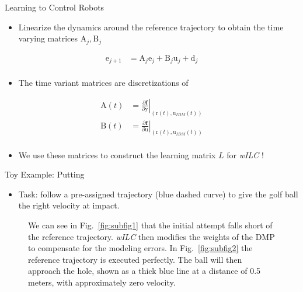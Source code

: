 \documentclass[handout]{beamer}
\newcommand{\boldvec}[1]{\boldsymbol{\mathrm{#1}}}
\let\vec\boldvec
\newcommand\at[2]{\left.#1\right|_{#2}} %
\newcommand{\state}{\vec{y}} %
\newcommand{\error}{\vec{e}} %
\newcommand{\traj}{\vec{r}} %
\newcommand{\linDist}{\vec{d}} %
\newcommand{\sysInput}{\vec{u}} %
\newcommand{\alg}{\emph{wILC }}
\begin{document}
\begin{frame}{Learning to Control Robots}
\begin{itemize}
\item Linearize the dynamics around the reference trajectory to obtain the time varying matrices $\vec{A}_j, \vec{B}_j$
\end{itemize}
\begin{equation*}
\begin{aligned}
\error_{j+1} &= \vec{A}_j\error_j + \vec{B}_j\sysInput_j + \linDist_j\\
\end{aligned}
\end{equation*} 
\begin{itemize}
\item The time variant matrices are discretizations of 
\end{itemize}
\begin{equation*}
\begin{aligned}
\vec{A}(t) & = \at{\frac{\partial{\mathbf{f}}}{\partial{\state}}}{(\traj(t),\sysInput_{IDM}(t))} \\
\vec{B}(t) & = \at{\frac{\partial{\mathbf{f}}}{\partial{\sysInput}}}{(\traj(t),\sysInput_{IDM}(t))} \\
\end{aligned}
\end{equation*}
\begin{itemize}
\item We use these matrices to construct the learning matrix $L$ for \alg! 
\end{itemize}
\end{frame}
%
\begin{frame}{Toy Example: Putting}
\begin{itemize}
\item Task: follow a pre-assigned trajectory (blue dashed curve) to give the golf ball the right velocity at impact.
\end{itemize}
\begin{figure}[ht]
\centering
{}
\caption{We can see in Fig.~\ref{fig:subfig1} that the initial attempt falls short of the reference trajectory. \alg then modifies the weights of the DMP to compensate for the modeling errors. In Fig.~\ref{fig:subfig2} the reference trajectory is executed perfectly. The ball will then approach the hole, shown as a thick blue line at a distance of 0.5 meters, with approximately zero velocity.} 
\label{putting1} 
\end{figure}
\end{frame}
\end{document}
